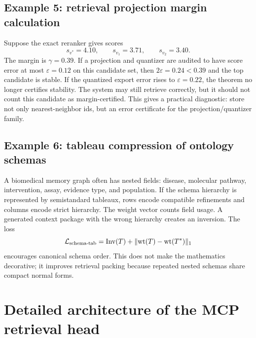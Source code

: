 \documentclass[11pt]{article}
\newcommand{\loss}{\mathcal{L}}
\newcommand{\eps}{\varepsilon}
\numberwithin{equation}{section}
\begin{document}
\subsection{Example 5: retrieval projection margin calculation}
Suppose the exact reranker gives scores
\begin{equation}
s_{v^*}=4.10,\qquad s_{v_1}=3.71,\qquad s_{v_2}=3.40.
\end{equation}
The margin is $\gamma=0.39$. If a projection and quantizer are audited to have score error at most $\eps=0.12$ on this candidate set, then $2\eps=0.24<0.39$ and the top candidate is stable. If the quantized export error rises to $\eps=0.22$, the theorem no longer certifies stability. The system may still retrieve correctly, but it should not count this candidate as margin-certified. This gives a practical diagnostic: store not only nearest-neighbor ids, but an error certificate for the projection/quantizer family.

\subsection{Example 6: tableau compression of ontology schemas}
A biomedical memory graph often has nested fields: disease, molecular pathway, intervention, assay, evidence type, and population. If the schema hierarchy is represented by semistandard tableaux, rows encode compatible refinements and columns encode strict hierarchy. The weight vector counts field usage. A generated context package with the wrong hierarchy creates an inversion. The loss
\begin{equation}
\loss_{\rm schema\text{-}tab}=\operatorname{Inv}(T)+\|\mathrm{wt}(T)-\mathrm{wt}(T^*)\|_1
\end{equation}
encourages canonical schema order. This does not make the mathematics decorative; it improves retrieval packing because repeated nested schemas share compact normal forms.

\section{Detailed architecture of the MCP retrieval head}
\end{document}
